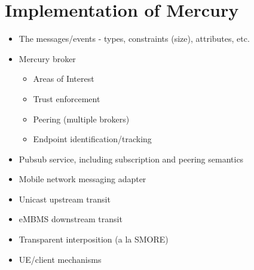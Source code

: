 \section*{Implementation of Mercury}

\begin{itemize}
\item The messages/events - types, constraints (size), attributes, etc.
\item Mercury broker
  \begin{itemize}
  \item Areas of Interest
  \item Trust enforcement
  \item Peering (multiple brokers)
  \item Endpoint identification/tracking
  \end{itemize}
\item Pubsub service, including subscription and peering semantics
\item Mobile network messaging adapter
\item Unicast upstream transit
\item eMBMS downstream transit
\item Transparent interposition (a la SMORE)
\item UE/client mechanisms
\end{itemize}
